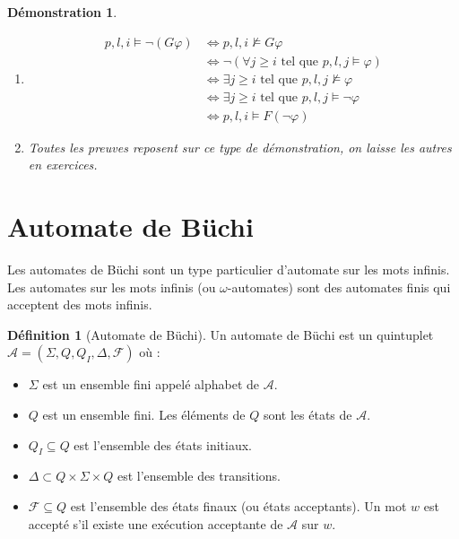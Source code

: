 \documentclass[12pt,a4paper]{article}
\theoremstyle{plain}
\newtheorem{dem}{Démonstration}
\theoremstyle{definition}
\newtheorem{defi}{Définition}
\begin{document}
\begin{dem}
	\leavevmode
	\begin{enumerate}
		\item[2.]
		\begin{align*}
			 p,l,i \models \lnot (G \varphi) &\Leftrightarrow p,l,i \not \models G \varphi \\
			 &\Leftrightarrow \lnot (\forall j \geq i\textrm{ tel que } p,l,j \models \varphi) \\
			 &\Leftrightarrow \exists j \geq i \textrm{ tel que } p,l,j \not \models \varphi \\
			 &\Leftrightarrow \exists j \geq i \textrm{ tel que } p,l,j \models \lnot \varphi \\
			 &\Leftrightarrow p,l,i \models F (\lnot \varphi)
		\end{align*}

		\item[] Toutes les preuves reposent sur ce type de démonstration, on laisse les autres en exercices.
	\end{enumerate}
\end{dem}



\section{Automate de Büchi}
Les automates de Büchi sont un type particulier d'automate sur les mots infinis.
Les automates sur les mots infinis (ou $\omega$-automates) sont des automates finis qui acceptent des mots infinis.

\begin{defi}[Automate de Büchi]
  Un automate de Büchi est un quintuplet $\mathcal{A}=(\Sigma, Q, Q_I, \Delta, \mathscr{F})$ où :
  \begin{itemize}
  \item $\Sigma$ est un ensemble fini appelé alphabet de $\mathcal{A}$.
  \item $Q$ est un ensemble fini. Les éléments de $Q$ sont les états de $\mathcal{A}$.
  \item $Q_I \subseteq Q$ est l'ensemble des états initiaux.
  \item $\Delta \subset Q \times \Sigma \times Q$ est l'ensemble des transitions.
  \item $\mathscr{F} \subseteq Q$ est l'ensemble des états finaux (ou états acceptants).
    Un mot $w$ est accepté s'il existe une exécution acceptante de $\mathcal{A}$ sur $w$.
  \end{itemize}
\end{defi}
\end{document}
